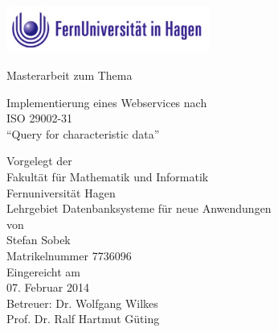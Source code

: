 \begin{titlepage}
\vspace{4em}
\begin{center}
	\includegraphics[width=0.50\textwidth]{images/feulogo.jpg}
\end{center}
\center

\Huge{\textsf{Masterarbeit zum Thema}}
 \vspace{1em}

\Huge{\textsf{Implementierung eines Webservices nach \\ ISO 29002-31 \\  \enquote{Query for characteristic data}}}
\vspace{1em}
\\


\vspace{1em}

{\normalsize 
\textsf{
Vorgelegt der\\
Fakultät für Mathematik und Informatik\\Fernuniversität Hagen\\Lehrgebiet Datenbanksysteme für neue Anwendungen
}
}
\vspace{2em}
\\

\normalsize{
	\textsf{
	von \\
Stefan Sobek \\ 
Matrikelnummer 7736096 \\
\vspace{2em}
Eingereicht am \\  
07. Februar 2014
\vspace{3em}
\\
Betreuer: Dr. Wolfgang Wilkes\\
Prof. Dr. Ralf Hartmut Güting \\
}
}
\end{titlepage}
